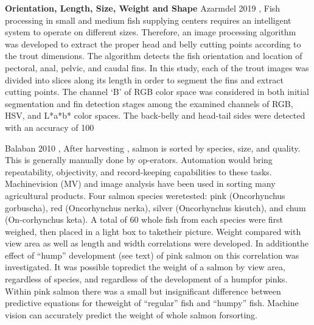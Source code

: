 \textbf{Orientation, Length, Size, Weight and Shape}\newline
Azarmdel 2019 \cite{Azarmdel2019DevelopingAO},
Fish processing in small and medium fish supplying centers requires an intelligent system to operate on different sizes. Therefore, an image processing algorithm was developed to extract the proper head and belly cutting points according to the trout dimensions. The algorithm detects the fish orientation and location of pectoral, anal, pelvic, and caudal fins. In this study, each of the trout images was divided into slices along its length in order to segment the fins and extract cutting points. The channel ‘B’ of RGB color space was considered in both initial segmentation and fin detection stages among the examined channels of RGB, HSV, and L*a*b* color spaces. The back-belly and head-tail sides were detected with an accuracy of 100%

Balaban 2010 \cite{Balaban2010UsingIA},
After harvesting , salmon is sorted by species, size, and quality. This is generally manually done by op-erators. Automation would bring repeatability, objectivity, and record-keeping capabilities to these tasks. Machinevision (MV) and image analysis have been used in sorting many agricultural products. Four salmon species weretested: pink (Oncorhynchus gorbuscha), red (Oncorhynchus nerka), silver (Oncorhynchus kisutch), and chum (On-corhynchus keta). A total of 60 whole fish from each species were first weighed, then placed in a light box to taketheir picture. Weight compared with view area as well as length and width correlations were developed. In additionthe effect of “hump” development (see text) of pink salmon on this correlation was investigated. It was possible topredict the weight of a salmon by view area, regardless of species, and regardless of the development of a humpfor pinks. Within pink salmon there was a small but insignificant difference between predictive equations for theweight of “regular” fish and “humpy” fish. Machine vision can accurately predict the weight of whole salmon forsorting.

